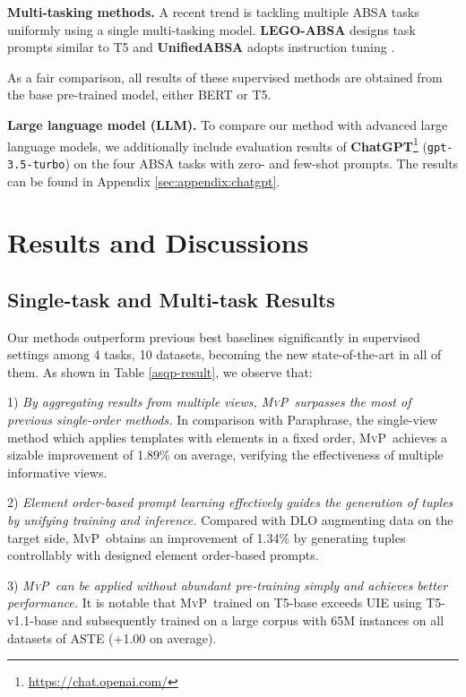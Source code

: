\documentclass[11pt]{article}
\newcommand\mvp{\textsc{MvP}}
\begin{document}
 

    \textbf{Multi-tasking methods.}
    A recent trend is tackling multiple ABSA tasks uniformly using a single multi-tasking model. \textbf{LEGO-ABSA} \cite{gao-etal-2022-lego} designs task prompts similar to T5 and \textbf{UnifiedABSA} \cite{DBLP:journals/corr/abs-2211-10986} adopts instruction tuning \cite{mishra-etal-2022-cross, DBLP:conf/iclr/WeiBZGYLDDL22}.

As a fair comparison, all results of these supervised methods are obtained from the base pre-trained model, either BERT or T5.

    \textbf{Large language model (LLM).}
    To compare our method with advanced large language models, we additionally include evaluation results of \textbf{ChatGPT}\footnote{\url{https://chat.openai.com/}} (\texttt{gpt-3.5-turbo})  on the four ABSA tasks with zero- and few-shot prompts. 
    The results can be found in Appendix \ref{sec:appendix:chatgpt}.
    



 
\section{Results and Discussions}

\subsection{Single-task and Multi-task Results}
\label{subsec:results:supervised}
Our methods outperform previous best baselines significantly in supervised settings among 4 tasks, 10 datasets, becoming the new state-of-the-art in all of them. As shown in Table \ref{asqp-result}, we observe that:

 1) \textit{By aggregating results from multiple views, \mvp~surpasses the most of previous single-order methods.}
 In comparison with Paraphrase, the single-view method which applies templates with elements in a fixed order, \mvp~achieves a sizable improvement of 1.89\% on average, verifying the effectiveness of multiple informative views. 
 
2) \textit{Element order-based prompt learning effectively guides the generation of tuples by unifying training and inference.} Compared with DLO augmenting data on the target side, \mvp~obtains an improvement of 1.34\% by generating tuples controllably with designed element order-based prompts. 

3) \textit{\mvp~can be applied without abundant pre-training simply and achieves better performance.}
It is notable that \mvp~trained on T5-base exceeds UIE using T5-v1.1-base and subsequently trained on a large corpus with 65M instances on all datasets of ASTE (+1.00 on average). 
 
\end{document}
